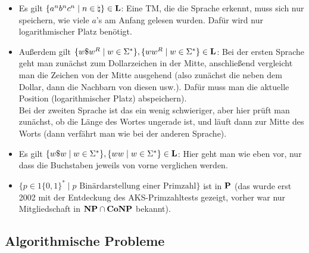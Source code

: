 \begin{Bsp}
    \begin{itemize}
        \item
        Es gilt $\{a^n b^n c^n \;|\; n \in \natural\} \in \L$:
        Eine TM, die die Sprache erkennt, muss sich nur speichern, wie viele $a$'s am Anfang
        gelesen wurden.
        Dafür wird nur logarithmischer Platz benötigt.
        
        \item
        Außerdem gilt $\{w \dollar w^R \;|\; w \in \Sigma^\ast\},
        \{w w^R \;|\; w \in \Sigma^\ast\} \in \L$:
        Bei der ersten Sprache geht man zunächst zum Dollarzeichen in der Mitte,
        anschließend vergleicht man die Zeichen
        von der Mitte ausgehend (also zunächst die neben dem Dollar, dann die Nachbarn von
        diesen usw.).
        Dafür muss man die aktuelle Position (logarithmischer Platz) abspeichern).\\
        Bei der zweiten Sprache ist das ein wenig schwieriger, aber hier prüft man zunächst,
        ob die Länge des Wortes ungerade ist, und läuft dann zur Mitte des Worts
        (dann verfährt man wie bei der anderen Sprache).
        
        \item
        Es gilt $\{w \dollar w \;|\; w \in \Sigma^\ast\},
        \{w w \;|\; w \in \Sigma^\ast\} \in \L$:
        Hier geht man wie eben vor, nur dass die Buchstaben jeweils von vorne verglichen werden.
        
        \item
        $\{p \in 1\{0, 1\}^\ast \;|\; p \text{ Binärdarstellung einer Primzahl}\}$ ist in $\P$
        (das wurde erst 2002 mit der Entdeckung des AKS-Primzahltests
        gezeigt, vorher war nur Mitgliedschaft in $\NP \cap \Co\NP$ bekannt).
    \end{itemize}
\end{Bsp}

\subsection{%
    Algorithmische Probleme%
}


